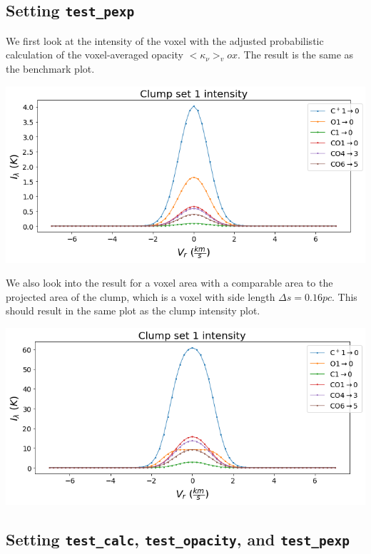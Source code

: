 \documentclass[a4paper]{article}
\begin{document}
    \pagebreak

    \subsection{Setting \texttt{test\_pexp}}

    We first look at the intensity of the voxel with the adjusted probabilistic calculation of the voxel-averaged opacity \(<\kappa_\nu>_vox\).
    The result is the same as the benchmark plot.

    \includegraphics*[width=\linewidth]{voxel_convergence_fv-pexp.png}

    We also look into the result for a voxel area with a comparable area to the projected area of the clump, which is a voxel with side length \(\Delta s = 0.16 pc\).
    This should result in the same plot as the clump intensity plot.

    \includegraphics*[width=\linewidth]{voxel_single-clump_fv-pexp.png}

    \pagebreak

    \subsection{Setting \texttt{test\_calc}, \texttt{test\_opacity}, and \texttt{test\_pexp}}
\end{document}
